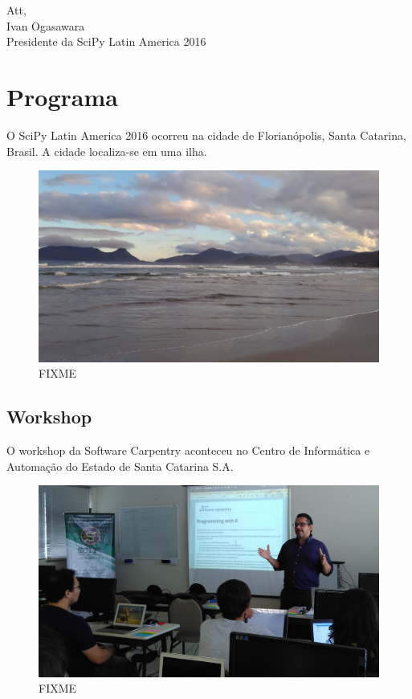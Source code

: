 \documentclass[12pt]{article}
\begin{document}
Att, \\
\indent Ivan Ogasawara \\
\indent Presidente da SciPy Latin America 2016


\clearpage
\newpage

\section*{Programa}

O SciPy Latin America 2016 ocorreu na cidade de Florianópolis, Santa Catarina,
Brasil. A cidade localiza-se em uma ilha.

\noindent  %
\begin{figure}[!htb]
\center
\includegraphics[height=.3\textheight]{venue-beach.jpg}
\caption{FIXME}
\end{figure}

\subsection*{Workshop}

O workshop da Software Carpentry aconteceu no Centro de Informática e Automação
do Estado de Santa Catarina S.A.

\noindent  %
\begin{figure}[!htb]
\center
\includegraphics[height=.3\textheight]{swc-francisco.jpg}
\caption{FIXME}
\end{figure}
\end{document}
